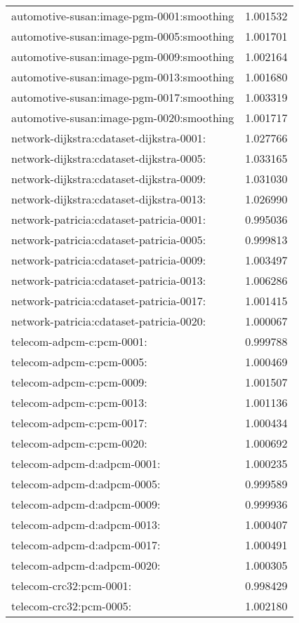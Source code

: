\begin{longtable}{lr}
automotive-susan:image-pgm-0001:smoothing & 1.001532 \\
automotive-susan:image-pgm-0005:smoothing & 1.001701 \\
automotive-susan:image-pgm-0009:smoothing & 1.002164 \\
automotive-susan:image-pgm-0013:smoothing & 1.001680 \\
automotive-susan:image-pgm-0017:smoothing & 1.003319 \\
automotive-susan:image-pgm-0020:smoothing & 1.001717 \\
network-dijkstra:cdataset-dijkstra-0001: & 1.027766 \\
network-dijkstra:cdataset-dijkstra-0005: & 1.033165 \\
network-dijkstra:cdataset-dijkstra-0009: & 1.031030 \\
network-dijkstra:cdataset-dijkstra-0013: & 1.026990 \\
network-patricia:cdataset-patricia-0001: & 0.995036 \\
network-patricia:cdataset-patricia-0005: & 0.999813 \\
network-patricia:cdataset-patricia-0009: & 1.003497 \\
network-patricia:cdataset-patricia-0013: & 1.006286 \\
network-patricia:cdataset-patricia-0017: & 1.001415 \\
network-patricia:cdataset-patricia-0020: & 1.000067 \\
telecom-adpcm-c:pcm-0001: & 0.999788 \\
telecom-adpcm-c:pcm-0005: & 1.000469 \\
telecom-adpcm-c:pcm-0009: & 1.001507 \\
telecom-adpcm-c:pcm-0013: & 1.001136 \\
telecom-adpcm-c:pcm-0017: & 1.000434 \\
telecom-adpcm-c:pcm-0020: & 1.000692 \\
telecom-adpcm-d:adpcm-0001: & 1.000235 \\
telecom-adpcm-d:adpcm-0005: & 0.999589 \\
telecom-adpcm-d:adpcm-0009: & 0.999936 \\
telecom-adpcm-d:adpcm-0013: & 1.000407 \\
telecom-adpcm-d:adpcm-0017: & 1.000491 \\
telecom-adpcm-d:adpcm-0020: & 1.000305 \\
telecom-crc32:pcm-0001: & 0.998429 \\
telecom-crc32:pcm-0005: & 1.002180 \\

\end{longtable}
